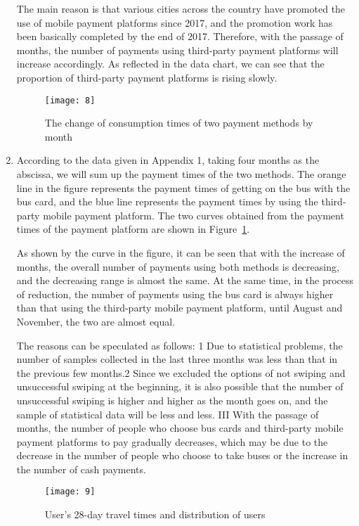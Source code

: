 \documentclass[../mcmpaper]{subfiles}
\begin{document}
\begin{enumerate}[label=\arabic*., format=\bfseries, itemindent=0pt, leftmargin=0pt, topsep=0pt, listparindent=\parindent, itemsep=1pt]
\par
The main reason is that various cities across the country have promoted the use of mobile payment platforms since 2017, and the promotion work has been basically completed by the end of 2017. Therefore, with the passage of months, the number of payments using third-party payment platforms will increase accordingly. As reflected in the data chart, we can see that the proportion of third-party payment platforms is rising slowly.
\begin{figure}[!ht]
\centering
\texttt{[image: 8]}
\caption{The change of consumption times of two payment methods by month}
\label{fig:5.4}
\end{figure}
    \item According to the data given in Appendix 1, taking four months as the abscissa, we will sum up the payment times of the two methods. The orange line in the figure represents the payment times of getting on the bus with the bus card, and the blue line represents the payment times by using the third-party mobile payment platform. The two curves obtained from the payment times of the payment platform are shown in Figure~\ref{fig:5.4}.
\par
As shown by the curve in the figure, it can be seen that with the increase of months, the overall number of payments using both methods is decreasing, and the decreasing range is almost the same. At the same time, in the process of reduction, the number of payments using the bus card is always higher than that using the third-party mobile payment platform, until August and November, the two are almost equal.
\par
The reasons can be speculated as follows: 1 Due to statistical problems, the number of samples collected in the last three months was less than that in the previous few months.2 Since we excluded the options of not swiping and unsuccessful swiping at the beginning, it is also possible that the number of unsuccessful swiping is higher and higher as the month goes on, and the sample of statistical data will be less and less. III With the passage of months, the number of people who choose bus cards and third-party mobile payment platforms to pay gradually decreases, which may be due to the decrease in the number of people who choose to take buses or the increase in the number of cash payments.
\begin{figure}[!ht]
\centering
\begin{minipage}[c]{0.48\linewidth}
    \centering
    \texttt{[image: 9]}
    \caption{User's 28-day travel times and distribution of users}

\end{minipage}
\end{figure}
\end{enumerate}
\end{document}
